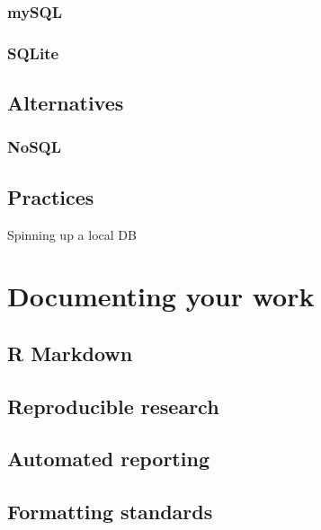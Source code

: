 \documentclass[
]{book}
\begin{document}
\hypertarget{mysql}{%
\section{mySQL}\label{mysql}}

\hypertarget{sqlite}{%
\section{SQLite}\label{sqlite}}

\hypertarget{alternatives}{%
\chapter{Alternatives}\label{alternatives}}

\hypertarget{nosql}{%
\section{NoSQL}\label{nosql}}

\hypertarget{practices}{%
\chapter{Practices}\label{practices}}

Spinning up a local DB

\hypertarget{part-documenting-your-work}{%
\part{Documenting your work}\label{part-documenting-your-work}}

\hypertarget{r-markdown}{%
\chapter{R Markdown}\label{r-markdown}}

\hypertarget{reproducible-research}{%
\chapter{Reproducible research}\label{reproducible-research}}

\hypertarget{automated-reporting}{%
\chapter{Automated reporting}\label{automated-reporting}}

\hypertarget{formatting-standards}{%
\chapter{Formatting standards}\label{formatting-standards}}
\end{document}
